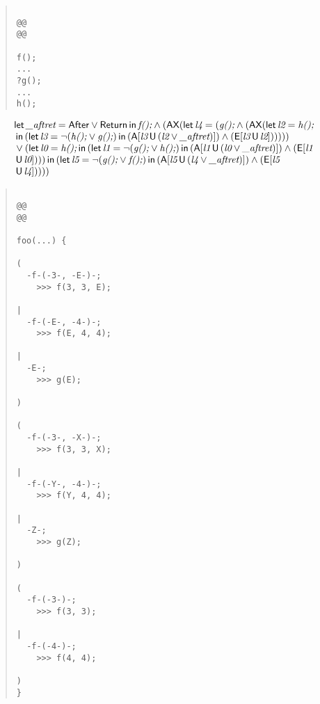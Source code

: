 \documentclass{article}
\newcommand{\U}{\,\mbox{\sf{U}}\,}
\newcommand{\A}{\mbox{\sf{A}}}
\newcommand{\E}{\mbox{\sf{E}}}
\newcommand{\AX}{\mbox{\sf{AX}}}
\newcommand{\mita}[1]{\mbox{\it{{#1}}}}
\newcommand{\msf}[1]{\mbox{\sf{{#1}}}}
\begin{document}
\begin{quote}\begin{verbatim}

@@
@@

f();
...
?g();
...
h();
\end{verbatim}\end{quote}

\[\begin{array}{l}
\mita{\sf{let}} \, \mita{\_aftret} = \msf{After} \vee \msf{Return} \, \mita{\sf{in}} \, \mita{f();} \wedge (\AX(\mita{\sf{let}} \, \mita{l4} = (\mita{g();} \wedge (\AX(\mita{\sf{let}} \, \mita{l2} = \mita{h();}\\\mbox{} \, \mita{\sf{in}} \, (\mita{\sf{let}} \, \mita{l3} = \neg (\mita{h();} \vee \mita{g();}) \, \mita{\sf{in}} \, (\A[\mita{l3} \U (\mita{l2} \vee \mita{\_aftret})]
) \wedge (\E[\mita{l3} \U \mita{l2}]
)
)
)))\\\mbox{} \vee (\mita{\sf{let}} \, \mita{l0} = \mita{h();} \, \mita{\sf{in}} \, (\mita{\sf{let}} \, \mita{l1} = \neg (\mita{g();} \vee \mita{h();}) \, \mita{\sf{in}} \, (\A[\mita{l1} \U (\mita{l0} \vee \mita{\_aftret})]
) \wedge (\E[\mita{l1}\\\mbox{} \U \mita{l0}]
)
)
) \, \mita{\sf{in}} \, (\mita{\sf{let}} \, \mita{l5} = \neg (\mita{g();} \vee \mita{f();}) \, \mita{\sf{in}} \, (\A[\mita{l5} \U (\mita{l4} \vee \mita{\_aftret})]
) \wedge (\E[\mita{l5}\\\mbox{} \U \mita{l4}]
)
)
))

\end{array}\]

\begin{quote}\begin{verbatim}

@@
@@

foo(...) {
  
(
  -f-(-3-, -E-)-;
    >>> f(3, 3, E);
  
|
  -f-(-E-, -4-)-;
    >>> f(E, 4, 4);
  
|
  -E-;
    >>> g(E);
  
)
  
(
  -f-(-3-, -X-)-;
    >>> f(3, 3, X);
  
|
  -f-(-Y-, -4-)-;
    >>> f(Y, 4, 4);
  
|
  -Z-;
    >>> g(Z);
  
)
  
(
  -f-(-3-)-;
    >>> f(3, 3);
  
|
  -f-(-4-)-;
    >>> f(4, 4);
  
)
}
\end{verbatim}\end{quote}
\end{document}
